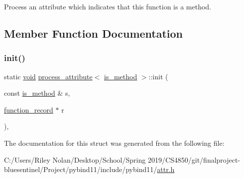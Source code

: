 Process an attribute which indicates that this function is a method. 

\subsection{Member Function Documentation}
\mbox{\label{structprocess__attribute_3_01is__method_01_4_a98ee80635d5dde17c53ce800e08c2a04}} 
\subsubsection{\texorpdfstring{init()}{init()}}
{\footnotesize\ttfamily static \mbox{\hyperlink{_s_d_l__opengles2__gl2ext_8h_ae5d8fa23ad07c48bb609509eae494c95}{void}} \mbox{\hyperlink{structprocess__attribute}{process\+\_\+attribute}}$<$ \mbox{\hyperlink{structis__method}{is\+\_\+method}} $>$\+::init (\begin{DoxyParamCaption}\item[{const \mbox{\hyperlink{structis__method}{is\+\_\+method}} \&}]{s,  }\item[{\mbox{\hyperlink{structfunction__record}{function\+\_\+record}} $\ast$}]{r }\end{DoxyParamCaption})\hspace{0.3cm}{\ttfamily [inline]}, {\ttfamily [static]}}



The documentation for this struct was generated from the following file\+:\begin{DoxyCompactItemize}
\item 
C\+:/\+Users/\+Riley Nolan/\+Desktop/\+School/\+Spring 2019/\+C\+S4850/git/finalproject-\/bluesentinel/\+Project/pybind11/include/pybind11/\mbox{\hyperlink{attr_8h}{attr.\+h}}\end{DoxyCompactItemize}
